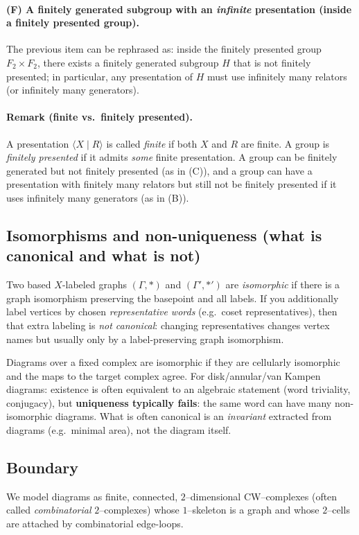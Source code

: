 \documentclass[11pt]{article}
\theoremstyle{definition}
\theoremstyle{plain}
\theoremstyle{remark}
\begin{document}
\paragraph{(F) A finitely generated subgroup with an \emph{infinite} presentation (inside a finitely presented group).}
The previous item can be rephrased as: inside the finitely presented group $F_2\times F_2$,
there exists a finitely generated subgroup $H$ that is not finitely presented; in particular, any presentation of $H$
must use infinitely many relators (or infinitely many generators).

\paragraph{Remark (finite vs.\ finitely presented).}
A presentation $\langle X\mid R\rangle$ is called \emph{finite} if both $X$ and $R$ are finite.
A group is \emph{finitely presented} if it admits \emph{some} finite presentation.
A group can be finitely generated but not finitely presented (as in (C)), and a group can have a presentation with finitely many relators
but still not be finitely presented if it uses infinitely many generators (as in (B)).


\subsection{Isomorphisms and non-uniqueness (what is canonical and what is not)}
Two based $X$-labeled graphs $(\Gamma,*)$ and $(\Gamma',*')$ are \emph{isomorphic} if there is a graph isomorphism preserving the basepoint and all labels.
If you additionally label vertices by chosen \emph{representative words} (e.g.\ coset representatives), then that extra labeling is \emph{not canonical}:
changing representatives changes vertex names but usually only by a label-preserving graph isomorphism.

Diagrams over a fixed complex are isomorphic if they are cellularly isomorphic and the maps to the target complex agree.
For disk/annular/van Kampen diagrams: existence is often equivalent to an algebraic statement (word triviality, conjugacy),
but \textbf{uniqueness typically fails}: the same word can have many non-isomorphic diagrams.
What is often canonical is an \emph{invariant} extracted from diagrams (e.g.\ minimal area), not the diagram itself.


\subsection{Boundary}
We model diagrams as finite, connected, $2$--dimensional CW--complexes (often called \emph{combinatorial} $2$--complexes) whose $1$--skeleton is a graph and whose $2$--cells are attached by combinatorial edge-loops.
\end{document}
